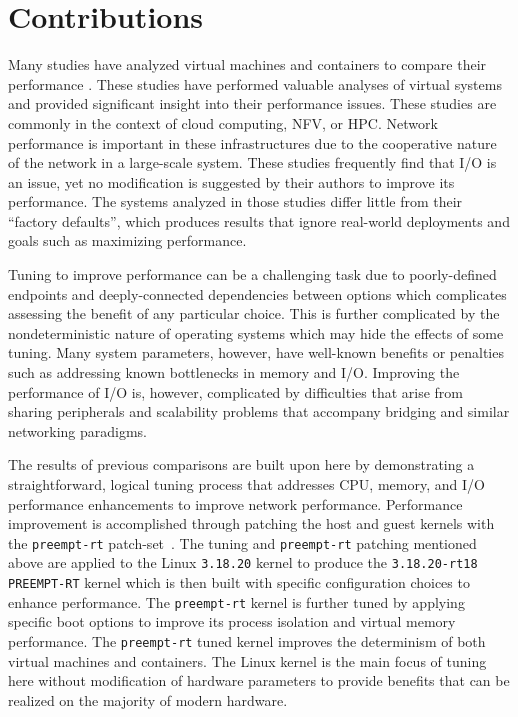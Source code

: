 \section{Contributions} %
\label{sec:introcontributiions}
Many studies have analyzed virtual machines and containers to compare their performance \autocite{soltesz2007container, matthews2007quantifying, gomes2014performance, seo2014performance, morabitohypervisors, xavier2013performance, _felter_1, rathore2013kvm, _scheepers_1, wangAllocation2007, _younge_1, _che_1}.
These studies have performed valuable analyses of virtual systems and provided significant insight into their performance issues.
These studies are commonly in the context of cloud computing, NFV, or HPC.
Network performance is important in these infrastructures due to the cooperative nature of the network in a large-scale system.
These studies frequently find that I/O is an issue, yet no modification is suggested by their authors to improve its performance.
The systems analyzed in those studies differ little from their ``factory defaults'', which produces results that ignore real-world deployments and goals such as maximizing performance.

Tuning to improve performance can be a challenging task due to poorly-defined endpoints and deeply-connected dependencies between options which complicates assessing the benefit of any particular choice.
This is further complicated by the nondeterministic nature of operating systems which may hide the effects of some tuning.
Many system parameters, however, have well-known benefits or penalties such as addressing known bottlenecks in memory and I/O.  
Improving the performance of I/O is, however, complicated by difficulties that arise from sharing peripherals and scalability problems that accompany bridging and similar networking paradigms.

The results of previous comparisons are built upon here by demonstrating a straightforward, logical tuning process that addresses CPU, memory, and I/O performance enhancements to improve network performance.
Performance improvement is accomplished through patching the host and guest kernels with the \texttt{preempt-rt} patch-set~\autocite{preemptrtpatches}.
The tuning and \texttt{preempt-rt} patching mentioned above are applied to the Linux \texttt{3.18.20} kernel to produce the \texttt{3.18.20-rt18 PREEMPT-RT} kernel which is then built with specific configuration choices to enhance performance. 
The \texttt{preempt-rt} kernel is further tuned by applying specific boot options to improve its process isolation and virtual memory performance.
The \texttt{preempt-rt} tuned kernel improves the determinism of both virtual machines and containers.
The Linux kernel is the main focus of tuning here without modification of hardware parameters to provide benefits that can be realized on the majority of modern hardware.

